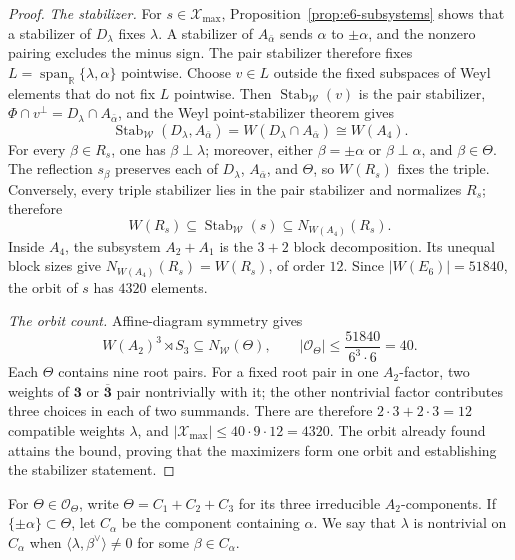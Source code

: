 \documentclass[11pt]{article}
\theoremstyle{remark}
\begin{document}
\begin{proof}
\emph{The stabilizer.} For \(s\in\mathcal X_{\max}\), Proposition~\ref{prop:e6-subsystems}
shows that a stabilizer of \(D_\lambda\) fixes \(\lambda\). A stabilizer
of \(A_{\bar\alpha}\) sends \(\alpha\) to \(\pm\alpha\), and the
nonzero pairing excludes the minus sign. The pair stabilizer therefore fixes
\(L=\operatorname{span}_{\mathbb R}\{\lambda,\alpha\}\) pointwise.
Choose \(v\in L\) outside the fixed subspaces of Weyl elements that do
not fix \(L\) pointwise. Then
\(\operatorname{Stab}_{\mathcal W}(v)\) is the pair stabilizer,
\(\Phi\cap v^\perp=D_\lambda\cap A_{\bar\alpha}\), and the Weyl
point-stabilizer theorem \cite[Ch.~V]{Bourbaki} gives
\[
 \operatorname{Stab}_{\mathcal W}(D_\lambda,A_{\bar\alpha})
 =W(D_\lambda\cap A_{\bar\alpha})\cong W(A_4).
\]
For every \(\beta\in R_s\), one has \(\beta\perp\lambda\); moreover,
either \(\beta=\pm\alpha\) or \(\beta\perp\alpha\), and
\(\beta\in\Theta\). The reflection \(s_\beta\) preserves each
of \(D_\lambda\), \(A_{\bar\alpha}\), and \(\Theta\), so
\(W(R_s)\) fixes the triple. Conversely, every triple stabilizer lies
in the pair stabilizer and normalizes \(R_s\); therefore
\[
 W(R_s)\subseteq\operatorname{Stab}_{\mathcal W}(s)
 \subseteq N_{W(A_4)}(R_s).
\]
Inside \(A_4\), the subsystem \(A_2+A_1\) is the \(3+2\) block
decomposition. Its unequal block sizes give
\(N_{W(A_4)}(R_s)=W(R_s)\), of order \(12\). Since
\(\lvert W(E_6)\rvert=51840\), the orbit of \(s\) has \(4320\)
elements.

\emph{The orbit count.} Affine-diagram symmetry \cite[Ch.~VI]{Bourbaki} gives
\[
 W(A_2)^3\rtimes S_3\subseteq N_{\mathcal W}(\Theta),
 \qquad
 \lvert\mathcal O_\Theta\rvert
 \le\frac{51840}{6^3\cdot6}=40.
\]
Each \(\Theta\) contains nine root pairs. For a fixed root pair in one
\(A_2\)-factor, two weights of \(\mathbf3\) or
\(\overline{\mathbf3}\) pair nontrivially with it; the other nontrivial
factor contributes three choices in each of two summands. There are therefore
\(2\cdot3+2\cdot3=12\) compatible weights \(\lambda\), and
\(\lvert\mathcal X_{\max}\rvert\le40\cdot9\cdot12=4320\).
The orbit already found attains the bound, proving that the maximizers form
one orbit and establishing the stabilizer statement.
\end{proof}


For \(\Theta\in\mathcal O_\Theta\), write
\(\Theta=C_1+C_2+C_3\) for its three irreducible \(A_2\)-components.
If \(\{\pm\alpha\}\subset\Theta\), let \(C_\alpha\) be the component
containing \(\alpha\). We say that \(\lambda\) is nontrivial on
\(C_\alpha\) when
\(\langle\lambda,\beta^\vee\rangle\ne0\) for some
\(\beta\in C_\alpha\).
\end{document}
